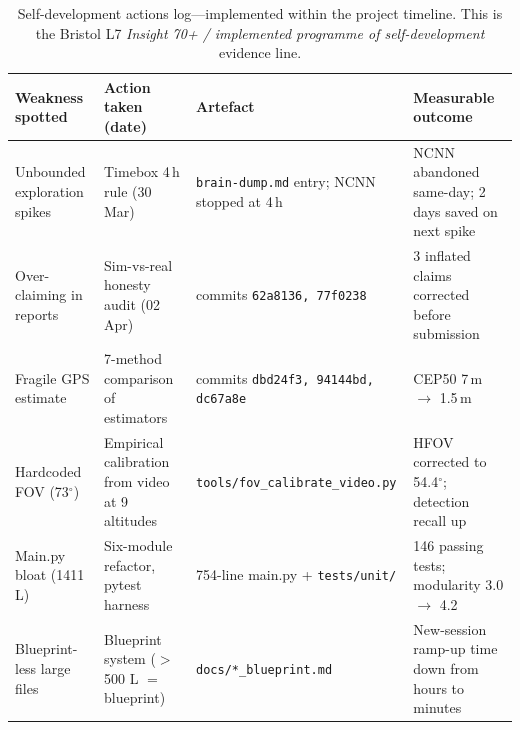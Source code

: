\begin{table}[H]
\centering\footnotesize
\caption{Self-development actions log---implemented within the project timeline. This is the Bristol L7 \emph{Insight 70+ / implemented programme of self-development} evidence line.}\label{tab:selfdev}
\begin{tabularx}{\textwidth}{@{}l X X X@{}}
\toprule
\textbf{Weakness spotted} & \textbf{Action taken (date)} & \textbf{Artefact} & \textbf{Measurable outcome} \\
\midrule
Unbounded exploration spikes & Timebox 4\,h rule (30\,Mar) & \texttt{brain-dump.md} entry; NCNN stopped at 4\,h & NCNN abandoned same-day; 2 days saved on next spike \\
Over-claiming in reports & Sim-vs-real honesty audit (02\,Apr) & commits \texttt{62a8136, 77f0238} & 3 inflated claims corrected before submission \\
Fragile GPS estimate & 7-method comparison of estimators & commits \texttt{dbd24f3, 94144bd, dc67a8e} & CEP50 7\,m $\to$ 1.5\,m \\
Hardcoded FOV (73$^{\circ}$) & Empirical calibration from video at 9 altitudes & \texttt{tools/fov\_calibrate\_video.py} & HFOV corrected to 54.4$^{\circ}$; detection recall up \\
Main.py bloat (1411 L) & Six-module refactor, pytest harness & 754-line main.py + \texttt{tests/unit/} & 146 passing tests; modularity 3.0 $\to$ 4.2 \\
Blueprint-less large files & Blueprint system ($>$500 L $=$ blueprint) & \texttt{docs/*\_blueprint.md} & New-session ramp-up time down from hours to minutes \\
\bottomrule
\end{tabularx}
\end{table}
